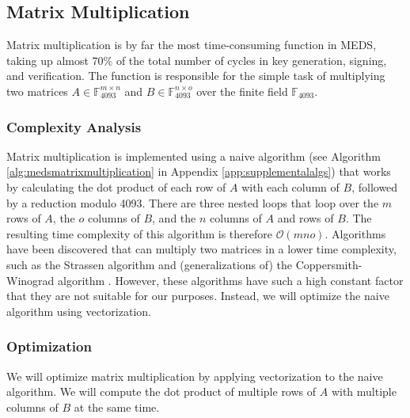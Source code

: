 \documentclass[11pt,a4paper]{report}
\theoremstyle{definition}
\begin{document}
\subsection{Matrix Multiplication}
\label{sec:matrixmultiplication}
Matrix multiplication is by far the most time-consuming function in MEDS, taking up almost 70\% of the total number of cycles in key generation, signing, and verification. The function is responsible for the simple task of multiplying two matrices $A \in \mathbb{F}_{4093}^{m \times n}$ and $B \in \mathbb{F}_{4093}^{n \times o}$ over the finite field $\mathbb{F}_{4093}$.

\subsubsection{Complexity Analysis}
\label{sec:matrixmultiplicationcomplexity}
Matrix multiplication is implemented using a naive algorithm (see Algorithm \ref{alg:medsmatrixmultiplication} in Appendix \ref{app:supplementalalgs}) that works by calculating the dot product of each row of $A$ with each column of $B$, followed by a reduction modulo 4093. There are three nested loops that loop over the $m$ rows of $A$, the $o$ columns of $B$, and the $n$ columns of $A$ and rows of $B$. The resulting time complexity of this algorithm is therefore $\mathcal{O}(mno)$. Algorithms have been discovered that can multiply two matrices in a lower time complexity, such as the Strassen algorithm \cite{strassen1969gaussian} and (generalizations of) the Coppersmith-Winograd algorithm \cite{coppersmith1987matrix}. However, these algorithms have such a high constant factor that they are not suitable for our purposes. Instead, we will optimize the naive algorithm using vectorization.

\subsubsection{Optimization}
\label{sec:matrixmultiplicationoptimization}
We will optimize matrix multiplication by applying vectorization to the naive algorithm. We will compute the dot product of multiple rows of $A$ with multiple columns of $B$ at the same time.
\end{document}

